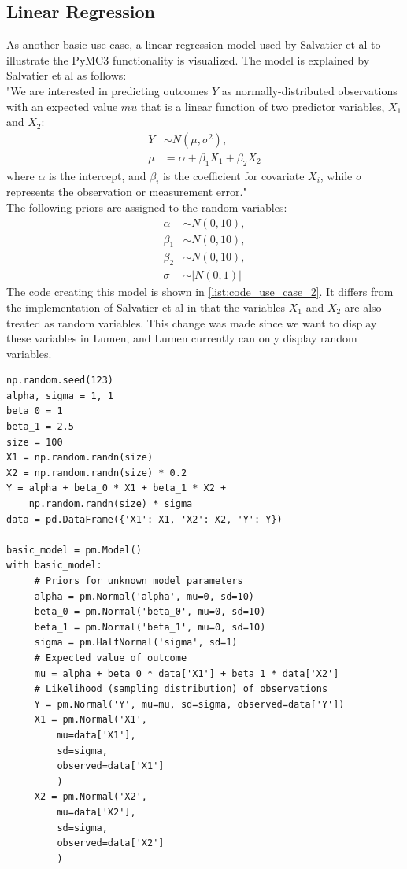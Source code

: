 \documentclass{article}
\begin{document}
\subsection{Linear Regression}
\label{subsec:linreg}
As another basic use case, a linear regression model used by Salvatier et al to illustrate the PyMC3 functionality \cite{Salvatier2016} is visualized. 
The model is explained by Salvatier et al as follows:\\
"We are interested in predicting outcomes $Y$ as normally-distributed observations with an expected value $mu$ that is a linear function of two predictor variables, $X_1$ and $X_2$:
\begin{equation}
\begin{split}
Y &\sim N(\mu,\sigma^2), \\
\mu &= \alpha + \beta_1 X_1 + \beta_2 X_2
\end{split}
\end{equation}
where $\alpha$ is the intercept, and $\beta_i$ is the coefficient for covariate $X_i$, while $\sigma$ represents the observation or measurement error."\\
The following priors are assigned to the random variables:
\begin{equation}
\begin{split}
\alpha &\sim N(0,10), \\
\beta_1 &\sim N(0,10), \\
\beta_2 &\sim N(0,10), \\
\sigma &\sim |N(0,1)|
\end{split}
\end{equation}
The code creating this model is shown in \autoref{list:code_use_case_2}. It differs from the implementation of Salvatier et al in that the variables $X_1$ and $X_2$ are also treated as random variables. This change was made since we want to display these variables in Lumen, and Lumen currently can only display random variables.
\begin{lstlisting}[caption={PyMC3 model of linear regression example}, label={list:code_use_case_2},captionpos=b]
np.random.seed(123)
alpha, sigma = 1, 1
beta_0 = 1
beta_1 = 2.5
size = 100
X1 = np.random.randn(size)
X2 = np.random.randn(size) * 0.2
Y = alpha + beta_0 * X1 + beta_1 * X2 + 
    np.random.randn(size) * sigma
data = pd.DataFrame({'X1': X1, 'X2': X2, 'Y': Y})
	
basic_model = pm.Model()
with basic_model:
     # Priors for unknown model parameters
     alpha = pm.Normal('alpha', mu=0, sd=10)
     beta_0 = pm.Normal('beta_0', mu=0, sd=10)
     beta_1 = pm.Normal('beta_1', mu=0, sd=10)
     sigma = pm.HalfNormal('sigma', sd=1)
     # Expected value of outcome 
     mu = alpha + beta_0 * data['X1'] + beta_1 * data['X2']
     # Likelihood (sampling distribution) of observations
     Y = pm.Normal('Y', mu=mu, sd=sigma, observed=data['Y'])
     X1 = pm.Normal('X1', 
         mu=data['X1'], 
         sd=sigma, 
         observed=data['X1']
         )
     X2 = pm.Normal('X2', 
         mu=data['X2'], 
         sd=sigma, 
         observed=data['X2']
         )
\end{lstlisting}
\end{document}
